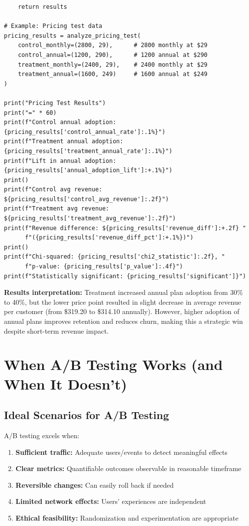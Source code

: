 \begin{lstlisting}
    return results

# Example: Pricing test data
pricing_results = analyze_pricing_test(
    control_monthly=(2800, 29),      # 2800 monthly at $29
    control_annual=(1200, 290),      # 1200 annual at $290
    treatment_monthly=(2400, 29),    # 2400 monthly at $29
    treatment_annual=(1600, 249)     # 1600 annual at $249
)

print("Pricing Test Results")
print("=" * 60)
print(f"Control annual adoption: {pricing_results['control_annual_rate']:.1%}")
print(f"Treatment annual adoption: {pricing_results['treatment_annual_rate']:.1%}")
print(f"Lift in annual adoption: {pricing_results['annual_adoption_lift']:+.1%}")
print()
print(f"Control avg revenue: ${pricing_results['control_avg_revenue']:.2f}")
print(f"Treatment avg revenue: ${pricing_results['treatment_avg_revenue']:.2f}")
print(f"Revenue difference: ${pricing_results['revenue_diff']:+.2f} "
      f"({pricing_results['revenue_diff_pct']:+.1%})")
print()
print(f"Chi-squared: {pricing_results['chi2_statistic']:.2f}, "
      f"p-value: {pricing_results['p_value']:.4f}")
print(f"Statistically significant: {pricing_results['significant']}")
\end{lstlisting}

\textbf{Results interpretation:} Treatment increased annual plan adoption from 30\% to 40\%, but the lower price point resulted in slight decrease in average revenue per customer (from \$319.20 to \$314.10 annually). However, higher adoption of annual plans improves retention and reduces churn, making this a strategic win despite short-term revenue impact.

\section{When A/B Testing Works (and When It Doesn't)}

\subsection{Ideal Scenarios for A/B Testing}

A/B testing excels when:

\begin{enumerate}
    \item \textbf{Sufficient traffic:} Adequate users/events to detect meaningful effects
    \item \textbf{Clear metrics:} Quantifiable outcomes observable in reasonable timeframe
    \item \textbf{Reversible changes:} Can easily roll back if needed
    \item \textbf{Limited network effects:} Users' experiences are independent
    \item \textbf{Ethical feasibility:} Randomization and experimentation are appropriate
\end{enumerate}

